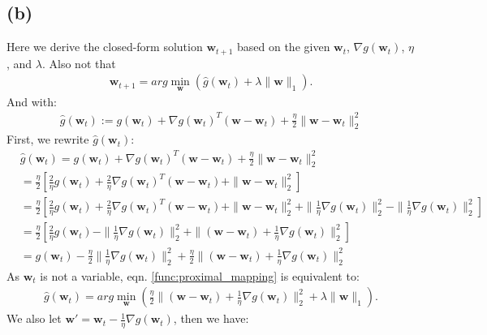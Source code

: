 \documentclass[a4paper,12pt]{article}
\begin{document}
\subsection*{(b)}
Here we derive the closed-form solution $\textbf{w}_{t+1}$ based on the given $\textbf{w}_t$,
$\nabla g(\textbf{w}_t)$, $\eta$, and $\lambda$.
Also not that 
\begin{align}
   \label{func:proximal_mapping}
   \textbf{w}_{t+1} = arg \min_{\textbf{w}} (\hat{g}(\textbf{w}_t) + \lambda \|\textbf{w}\|_1).
\end{align}
And with:
\begin{align}
   \label{func:quadratic}
   \hat{g}(\textbf{w}_t) := g(\textbf{w}_t) + \nabla g(\textbf{w}_t)^T(\textbf{w} - \textbf{w}_t) 
   + \frac{\eta}{2} \|\textbf{w} - \textbf{w}_t\|^2_2
\end{align}
First, we rewrite $\hat{g}(\textbf{w}_t)$:
\begin{align*}
   &\hat{g}(\textbf{w}_t) = g(\textbf{w}_t) + \nabla g(\textbf{w}_t)^T(\textbf{w} - \textbf{w}_t) + \frac{\eta}{2} \|\textbf{w} - \textbf{w}_t\|^2_2
   \\ &= \frac{\eta}{2} [\frac{2}{\eta} g(\textbf{w}_t) + \frac{2}{\eta}\nabla g(\textbf{w}_t)^T(\textbf{w} - \textbf{w}_t)+\|\textbf{w} - \textbf{w}_t\|^2_2]
   \\ &= \frac{\eta}{2} [\frac{2}{\eta} g(\textbf{w}_t) + \frac{2}{\eta}\nabla g(\textbf{w}_t)^T(\textbf{w} - \textbf{w}_t)+\|\textbf{w} - \textbf{w}_t\|^2_2 
   + \| \frac{1}{\eta}\nabla g(\textbf{w}_t) \|^2_2 - \|\frac{1}{\eta}\nabla g(\textbf{w}_t)\|^2_2]
   \\ &= \frac{\eta}{2}[\frac{2}{\eta} g(\textbf{w}_t) - \|\frac{1}{\eta}\nabla g(\textbf{w}_t)\|^2_2 + \| (\textbf{w} - \textbf{w}_t) + \frac{1}{\eta}\nabla g(\textbf{w}_t)  \|^2_2]
   \\ &= g(\textbf{w}_t) - \frac{\eta}{2}\|\frac{1}{\eta}\nabla g(\textbf{w}_t)\|^2_2 + \frac{\eta}{2}\| (\textbf{w} - \textbf{w}_t) + \frac{1}{\eta}\nabla g(\textbf{w}_t)  \|^2_2
\end{align*}
As $\textbf{w}_t$ is not a variable, eqn. \ref{func:proximal_mapping} is equivalent to:
\begin{align}
   \hat{g}(\textbf{w}_t) = arg \min_{\textbf{w}} (\frac{\eta}{2}\| (\textbf{w} - \textbf{w}_t) + \frac{1}{\eta}\nabla g(\textbf{w}_t)  \|^2_2 + \lambda \|\textbf{w}\|_1).
\end{align}
We also let $\textbf{w}' = \textbf{w}_t - \frac{1}{\eta}\nabla g(\textbf{w}_t)$, then we have:
\end{document}
